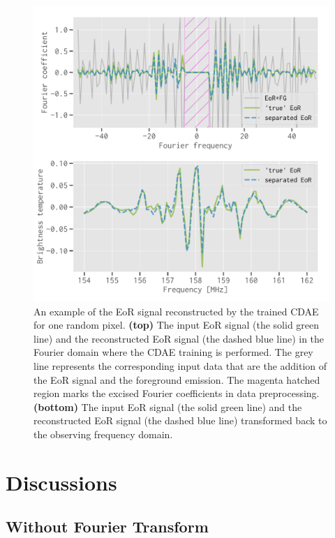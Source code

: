 \documentclass[letters,a4paper,fleqn,usenatbib]{mnras}
\begin{document}
\begin{figure}
  \centering
  \includegraphics[width=\columnwidth]{eor-result}
  \caption{\label{fig:result}%
    An example of the EoR signal reconstructed by the trained CDAE for
    one random pixel.
    \textbf{(top)} The input EoR signal (the solid green line) and the
    reconstructed EoR signal (the dashed blue line) in the Fourier domain
    where the CDAE training is performed.
    The grey line represents the corresponding input data that are the
    addition of the EoR signal and the foreground emission.
    The magenta hatched region marks the excised Fourier coefficients
    in data preprocessing.
    \textbf{(bottom)} The input EoR signal (the solid green line) and
    the reconstructed EoR signal (the dashed blue line) transformed back
    to the observing frequency domain.
  }
\end{figure}


\section{Discussions}
\label{sec:discussions}

\subsection{Without Fourier Transform}
\label{sec:noft}
\end{document}

